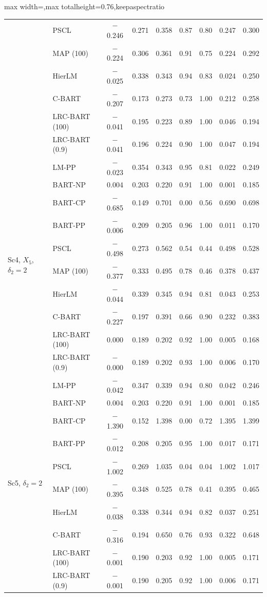 \documentclass[11pt]{article}
\theoremstyle{definition}
\theoremstyle{plain}
\begin{document}
{\begin{table}[htbp]
\begin{adjustbox}{max width=\textwidth,max totalheight=0.76\textheight,keepaspectratio}
\begin{tabular}{llccccccc}
& PSCL & $-$0.246 & 0.271 & 0.358 & 0.87 & 0.80 & 0.247 & 0.300 \\
& MAP (100) & $-$0.224 & 0.306 & 0.361 & 0.91 & 0.75 & 0.224 & 0.292 \\
& HierLM & $-$0.025 & 0.338 & 0.343 & 0.94 & 0.83 & 0.024 & 0.250 \\
& C-BART & $-$0.207 & 0.173 & 0.273 & 0.73 & 1.00 & 0.212 & 0.258 \\
& LRC-BART (100) & $-$0.041 & 0.195 & 0.223 & 0.89 & 1.00 & 0.046 & 0.194 \\
& LRC-BART (0.9) & $-$0.041 & 0.196 & 0.224 & 0.90 & 1.00 & 0.047 & 0.194 \\
\midrule
\multirow{10}{*}{Sc4, $X_5$, $\delta_2=2$} & LM-PP & $-$0.023 & 0.354 & 0.343 & 0.95 & 0.81 & 0.022 & 0.249 \\
& BART-NP & 0.004 & 0.203 & 0.220 & 0.91 & 1.00 & 0.001 & 0.185 \\
& BART-CP & $-$0.685 & 0.149 & 0.701 & 0.00 & 0.56 & 0.690 & 0.698 \\
& BART-PP & $-$0.006 & 0.209 & 0.205 & 0.96 & 1.00 & 0.011 & 0.170 \\
& PSCL & $-$0.498 & 0.273 & 0.562 & 0.54 & 0.44 & 0.498 & 0.528 \\
& MAP (100) & $-$0.377 & 0.333 & 0.495 & 0.78 & 0.46 & 0.378 & 0.437 \\
& HierLM & $-$0.044 & 0.339 & 0.345 & 0.94 & 0.81 & 0.043 & 0.253 \\
& C-BART & $-$0.227 & 0.197 & 0.391 & 0.66 & 0.90 & 0.232 & 0.383 \\
& LRC-BART (100) & 0.000 & 0.189 & 0.202 & 0.92 & 1.00 & 0.005 & 0.168 \\
& LRC-BART (0.9) & $-$0.000 & 0.189 & 0.202 & 0.93 & 1.00 & 0.006 & 0.170 \\
\midrule
\multirow{10}{*}{Sc5, $\delta_2=2$} & LM-PP & $-$0.042 & 0.347 & 0.339 & 0.94 & 0.80 & 0.042 & 0.246 \\
& BART-NP & 0.004 & 0.203 & 0.220 & 0.91 & 1.00 & 0.001 & 0.185 \\
& BART-CP & $-$1.390 & 0.152 & 1.398 & 0.00 & 0.72 & 1.395 & 1.399 \\
& BART-PP & $-$0.012 & 0.208 & 0.205 & 0.95 & 1.00 & 0.017 & 0.171 \\
& PSCL & $-$1.002 & 0.269 & 1.035 & 0.04 & 0.04 & 1.002 & 1.017 \\
& MAP (100) & $-$0.395 & 0.348 & 0.525 & 0.78 & 0.41 & 0.395 & 0.465 \\
& HierLM & $-$0.038 & 0.338 & 0.344 & 0.94 & 0.82 & 0.037 & 0.251 \\
& C-BART & $-$0.316 & 0.194 & 0.650 & 0.76 & 0.93 & 0.322 & 0.648 \\
& LRC-BART (100) & $-$0.001 & 0.190 & 0.203 & 0.92 & 1.00 & 0.005 & 0.171 \\
& LRC-BART (0.9) & $-$0.001 & 0.190 & 0.205 & 0.92 & 1.00 & 0.006 & 0.171 \\
\bottomrule
\end{tabular}
\end{adjustbox}
\end{table}

\clearpage}
\end{document}
